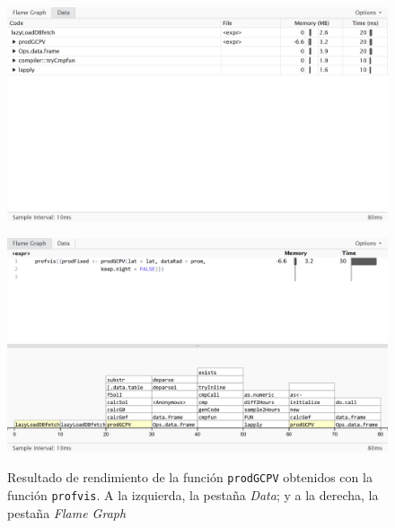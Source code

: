 \begin{figure}[h!]
  \centering
  \begin{minipage}[b]{0.5\textwidth}
    \centering
    \includegraphics[width=\textwidth]{figuras/data.png}
    \label{fig:data}
  \end{minipage}%
  \begin{minipage}[b]{0.5\textwidth}
    \centering
    \includegraphics[width=\textwidth]{figuras/flamegraph.png}
    \label{fig:flamegraph}
  \end{minipage}
  \caption{Resultado de rendimiento de la función \texttt{prodGCPV} obtenidos con la función \texttt{profvis}. A la izquierda, la pestaña \textit{Data}; y a la derecha, la pestaña \textit{Flame Graph}}
\end{figure}

